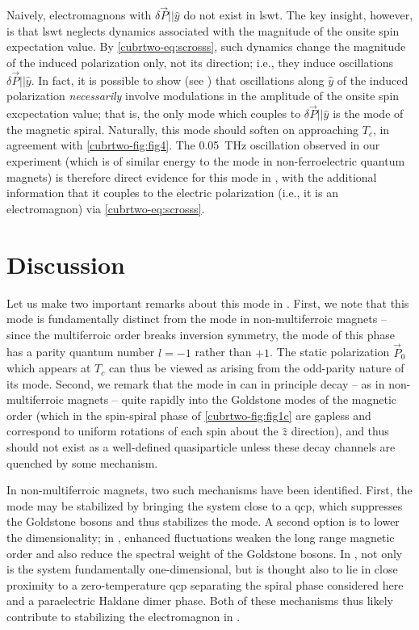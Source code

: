 Naively, electromagnons with $\delta\vec{P} || \hat{y}$ do not exist in \gls{lswt}.
The key insight, however, is that \gls{lswt} neglects dynamics associated with the magnitude of the onsite spin expectation value.
By \cref{cubrtwo-eq:scrosss}, such dynamics change the magnitude of the induced polarization only, not its direction; i.e., they induce oscillations $\delta\vec{P} || \hat{y}$.
In fact, it is possible to show (see ) that oscillations along $\hat{y}$ of the induced polarization \emph{necessarily} involve modulations in the amplitude of the onsite spin excpectation value; that is, the only mode which couples to $\delta\vec{P} || \hat{y}$ is the \higgs mode of the magnetic spiral.
Naturally, this mode should soften on approaching $T_c$, in agreement with \cref{cubrtwo-fig:fig4}.
The \qty{0.05}{THz} oscillation observed in our experiment (which is of similar energy to the \higgs mode in non-ferroelectric quantum magnets\citet{hong_higgs_2017}) is therefore direct evidence for this mode in , with the additional information that it couples to the electric polarization (i.e., it is an electromagnon) via \cref{cubrtwo-eq:scrosss}.

\section{Discussion}
Let us make two important remarks about this mode in .
First, we note that this mode is fundamentally distinct from the \higgs mode in non-multiferroic magnets -- since the multiferroic order breaks inversion symmetry, the \higgs mode of this phase has a parity quantum number $l=-1$ rather than $+1$.
The static polarization $\vec{P}_0$ which appears at $T_c$ can thus be viewed as arising from the odd-parity nature of its \higgs mode.
Second, we remark that the \higgs mode in  can in principle decay -- as in non-multiferroic magnets -- quite rapidly into the Goldstone modes of the magnetic order (which in the spin-spiral phase of \cref{cubrtwo-fig:fig1c} are gapless and correspond to uniform rotations of each spin about the $\hat{z}$ direction), and thus should not exist as a well-defined quasiparticle unless these decay channels are quenched by some mechanism.

In non-multiferroic magnets, two such mechanisms have been identified.
First, the \higgs mode may be stabilized by bringing the system close to a \gls{qcp}\cite{ruegg_quantum_2008,jain_higgs_2017,hong_higgs_2017,su_stable_2020}, which suppresses the Goldstone bosons and thus stabilizes the \higgs mode.
A second option is to lower the dimensionality\cite{canali_theory_1992,affleck_longitudinal_1992,schulz_dynamics_1996,essler_quasi-one-dimensional_1997,zhou_amplitude_2021}; in \oned, enhanced fluctuations weaken the long range magnetic order and also reduce the spectral weight of the Goldstone bosons\cite{zhou_amplitude_2021}. 
In , not only is the system fundamentally one-dimensional, but is thought also to lie in close proximity to a zero-temperature \gls{qcp}\cite{furukawa_ground-state_2012} separating the spiral phase considered here and a paraelectric Haldane dimer phase.
Both of these mechanisms thus likely contribute to stabilizing the \higgs electromagnon in .

